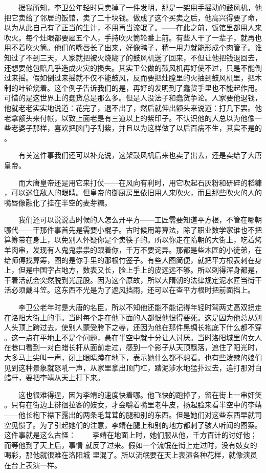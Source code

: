  　　据我所知，李卫公年轻时只卖掉了一件发明，那是一架用手摇动的鼓风机，他 把它卖给了邻居的饭馆，卖了二十块钱。做成了这个买卖之后，他高兴得要了命， 以为从此自己有了正当的生计，不用再当流氓了。——在此之前，饭馆里都用人来 吹火。每个灶眼都要雇五个人，手持吹火筒轮番上前。有些人干了一辈子，就再也 用不着吹火筒。他们的嘴唇长了出来，好像鸭子，稍一用力就能形成个肉管子。谁 知过了不到三天，人家就把被火烧糊了的鼓风机送了回来，不但让他把钱退回去， 还想要他包赔几乎造成火灾的损失。其实卫公做的鼓风机再好使不过，只是不能倒 过来摇。假如倒过来摇就不仅不能鼓风，反而要把灶膛里的火抽到鼓风机里，把木 制的叶轮烧着。这个例子告诉我们的是，再好的发明到了蠢货手里也不能起作用。 可惜的是这世界上的蠢货总是那么多。但是人没法子和蠢货争论。人家要他退钱， 他就老老实实地说道：花完了，退不出了，然后就伸出额头来说道：打几下罢。他 老拿额头来付帐，以致上面老是有三道以上的紫印子。不认识他的人总以为他像一 些老婆子那样，喜欢把脑门子刮紫，并且以为这样做了以后百病不生，其实不是的 。

 　　有关这件事我们还可以补充说，这架鼓风机后来也卖了出去，还是卖给了大唐 皇帝。

 　　而大唐皇帝还是用它来打仗——在风向有利时，用它吹起石灰粉和研碎的稻糠 ，可以迷住敌人的眼睛。但皇帝的御厨房里依旧用人来吹火，而且那些吹火的人的 嘴唇像融化了挂在半空的麦芽糖。

 　　我们还可以说说古时候的人怎么开平方——工匠需要知道平方根，不管在哪朝 哪代——干那件事首先是需要小棍子。古时候用筹算法，除了职业数学家谁也不把 算筹带在身上，以免别人怀疑你是个卖筷子的。所以你走在隋朝的大街上，吃着烤 羊肉串，发现有人鬼鬼祟祟的跟着你，千万不要诧异。那都是些木匠的小徒弟，在 给师傅找算筹，图的是你手里的那根竹签子。有些人图简便，就把平方根表刺在身 上，但是中国字占地方，数表又长，脸上手上的皮远远不够。所以刺得浑身都是， 干着活就会突然脱到光屁股。因为这个原故，所以大隋朝的法律规定泥水匠当街干 活必须戴斗笠。这东西不光是为了遮风挡雨，还可以在查平方根时把前面挡上。 

　　李卫公老年时是大唐的名臣，所以不知他还能不能记得年轻时驾两丈高双拐走 在洛阳大街上的事。当时每个走在他下面的人都恨他恨得要死。这是因为他总从别 人头顶上跨过去，使别人蒙受胯下之辱，还因为他在那件黑绸长袍底下什么都不穿 。这一点在平地上不是个问题，悬在半空中就十分让人讨厌。当时洛阳城里的女人 在巷口看到一对白蜡长杆从面前走过，感到一个影子从天顶飘落，遮住了阳光时， 大多马上尖叫一声，闭上眼睛蹲在地下，表示她什么都不想看。也有些泼辣的娘们 见到这种景象就怒吼一声，从家里拿出顶门杠，踏泥涉水地猛扑过去，追打那对白 蜡杆，要把李靖从天上打下来。 

　　这也很难得逞，因为李靖的速度快着哪。他飞快的跑掉了，留在街上一串奸笑 。只有在街边上徘徊拉客的妓女，才会嚼着嘴里老牛皮，扬起脸来看半空中的李靖 ——他长袍下襟下露出的两条毛茸茸的腿和别的东西。但是她们对这些东西早就司 空见惯了。为了引起她们的注意，李靖在腿上和别的地方都刺了骇人听闻的图案。 这件事就是这么古怪： 　　李靖在地面上时，她们服从他，千方百计的讨好他；而等他到了天上后，事情 就反了过来。假如一个流氓在街上走过时，没有妓女的喝彩，那他就很难在洛阳城 里混了。所以流氓要在天上表演各种花样，就像演员在台上表演一样。 

